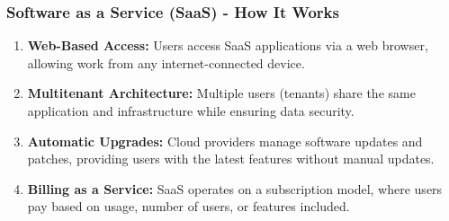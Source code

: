 \documentclass[aspectratio=169]{beamer}
\begin{document}
\begin{frame}[fragile]
    \frametitle{Software as a Service (SaaS) - How It Works}
    
    \begin{enumerate}
        \item \textbf{Web-Based Access:} Users access SaaS applications via a web browser, allowing work from any internet-connected device.
        
        \item \textbf{Multitenant Architecture:} Multiple users (tenants) share the same application and infrastructure while ensuring data security.
        
        \item \textbf{Automatic Upgrades:} Cloud providers manage software updates and patches, providing users with the latest features without manual updates.
        
        \item \textbf{Billing as a Service:} SaaS operates on a subscription model, where users pay based on usage, number of users, or features included.
    \end{enumerate}
\end{frame}
\end{document}
